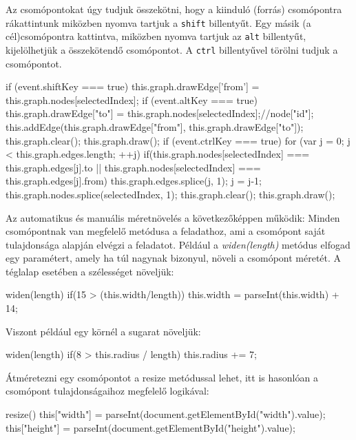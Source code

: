 Az csomópontokat úgy tudjuk összekötni, hogy a kiinduló (forrás) csomópontra rákattintunk miközben nyomva tartjuk a \texttt{shift} billentyűt. Egy másik (a cél)csomópontra kattintva, miközben nyomva tartjuk az \texttt{alt} billentyűt, kijelölhetjük a összekötendő csomópontot. A \texttt{ctrl} billentyűvel törölni tudjuk a csomópontot.

\begin{javascript}
if (event.shiftKey === true) {
   this.graph.drawEdge['from'] = this.graph.nodes[selectedIndex];
}
if (event.altKey === true) {
   this.graph.drawEdge["to"] = this.graph.nodes[selectedIndex];//node["id"];
   this.addEdge(this.graph.drawEdge["from"], this.graph.drawEdge["to"]);
   this.graph.clear();
   this.graph.draw();
}
if (event.ctrlKey === true) {
   for (var j = 0; j < this.graph.edges.length; ++j) {
       if(this.graph.nodes[selectedIndex] === this.graph.edges[j].to || this.graph.nodes[selectedIndex] === this.graph.edges[j].from)
       {
           this.graph.edges.splice(j, 1);
           j = j-1;
       }
   }
   this.graph.nodes.splice(selectedIndex, 1);
   this.graph.clear();
   this.graph.draw();
}
\end{javascript}

Az automatikus és manuális méretnövelés a következőképpen működik: Minden csomópontnak van megfelelő metódusa a feladathoz, ami a csomópont saját tulajdonsága alapján elvégzi a feladatot. Például a \textit{widen(length)} metódus elfogad egy paramétert, amely ha túl nagynak bizonyul, növeli a csomópont méretét. A téglalap esetében a szélességet növeljük:

\begin{javascript}
widen(length){
   if(15 > (this.width/length))
   {
       this.width = parseInt(this.width) + 14;
   }
}
\end{javascript}

Viszont például egy körnél a sugarat növeljük:

\begin{javascript}
widen(length){
   if(8 > this.radius / length)
   {
       this.radius += 7;
   }
}
\end{javascript}

Átméretezni egy csomópontot a resize metódussal lehet, itt is hasonlóan a csomópont tulajdonságaihoz megfelelő logikával:

\begin{javascript}
resize(){
   this["width"] = parseInt(document.getElementById("width").value);
   this["height"] =  parseInt(document.getElementById("height").value);
}
\end{javascript}


